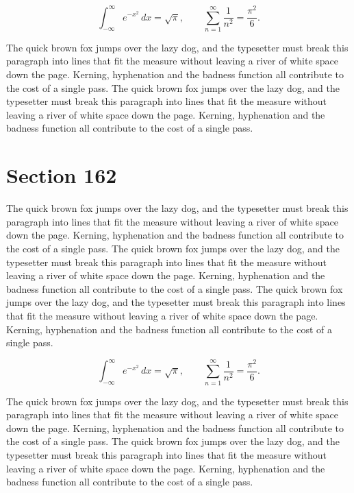 \documentclass{article}
\begin{document}
\begin{equation}
\int_{-\infty}^{\infty} e^{-x^{2}}\,dx = \sqrt{\pi}, \qquad
\sum_{n=1}^{\infty} \frac{1}{n^{2}} = \frac{\pi^{2}}{6}.
\end{equation}

The quick brown fox jumps over the lazy dog, and the typesetter must break this paragraph into lines that fit the measure without leaving a river of white space down the page. Kerning, hyphenation and the badness function all contribute to the cost of a single pass. The quick brown fox jumps over the lazy dog, and the typesetter must break this paragraph into lines that fit the measure without leaving a river of white space down the page. Kerning, hyphenation and the badness function all contribute to the cost of a single pass. 
\section{Section 162}
The quick brown fox jumps over the lazy dog, and the typesetter must break this paragraph into lines that fit the measure without leaving a river of white space down the page. Kerning, hyphenation and the badness function all contribute to the cost of a single pass. The quick brown fox jumps over the lazy dog, and the typesetter must break this paragraph into lines that fit the measure without leaving a river of white space down the page. Kerning, hyphenation and the badness function all contribute to the cost of a single pass. The quick brown fox jumps over the lazy dog, and the typesetter must break this paragraph into lines that fit the measure without leaving a river of white space down the page. Kerning, hyphenation and the badness function all contribute to the cost of a single pass. 

\begin{equation}
\int_{-\infty}^{\infty} e^{-x^{2}}\,dx = \sqrt{\pi}, \qquad
\sum_{n=1}^{\infty} \frac{1}{n^{2}} = \frac{\pi^{2}}{6}.
\end{equation}

The quick brown fox jumps over the lazy dog, and the typesetter must break this paragraph into lines that fit the measure without leaving a river of white space down the page. Kerning, hyphenation and the badness function all contribute to the cost of a single pass. The quick brown fox jumps over the lazy dog, and the typesetter must break this paragraph into lines that fit the measure without leaving a river of white space down the page. Kerning, hyphenation and the badness function all contribute to the cost of a single pass. 
\end{document}
